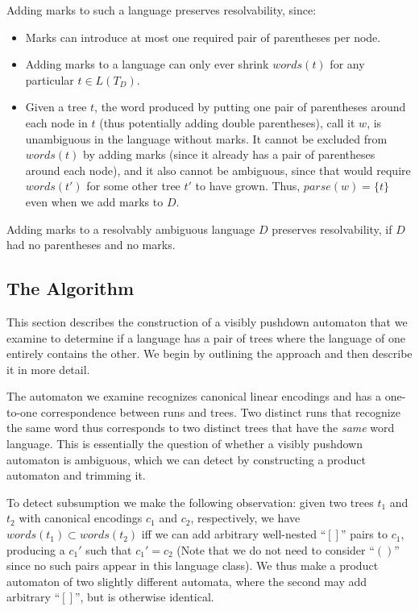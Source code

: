 \documentclass[runningheads]{llncs}
\newcommand{\parse}{\mathit{parse}} %
\newcommand{\words}{\mathit{words}} %
\newcommand{\reqpl}{(}
\newcommand{\reqpr}{)}
\newcommand{\reqp}[1]{\reqpl#1\reqpr}
\newcommand{\pospl}{[}
\newcommand{\pospr}{]}
\newcommand{\posp}[1]{\pospl#1\pospr}
\begin{document}
Adding marks to such a language preserves resolvability, since:

\begin{itemize}
  \item Marks can introduce at most one required pair of parentheses per node.
  \item Adding marks to a language can only ever shrink $\words(t)$ for any particular $t \in L(T_D)$.
  \item Given a tree $t$, the word produced by putting one pair of parentheses around each node in $t$ (thus potentially adding double parentheses), call it $w$, is unambiguous in the language without marks. It cannot be excluded from $\words(t)$ by adding marks (since it already has a pair of parentheses around each node), and it also cannot be ambiguous, since that would require $\words(t')$ for some other tree $t'$ to have grown. Thus, $\parse(w) = \{t\}$ even when we add marks to $D$.
\end{itemize}

\begin{theorem}
  Adding marks to a resolvably ambiguous language $D$ preserves resolvability, if $D$ had no parentheses and no marks.
\end{theorem}

\subsection{The Algorithm} \label{sec:lattice-vpl}

This section describes the construction of a visibly pushdown automaton that we examine to determine if a language has a pair of trees where the language of one entirely contains the other. We begin by outlining the approach and then describe it in more detail.

The automaton we examine recognizes canonical linear encodings and has a one-to-one correspondence between runs and trees. Two distinct runs that recognize the same word thus corresponds to two distinct trees that have the \emph{same} word language. This is essentially the question of whether a visibly pushdown automaton is ambiguous, which we can detect by constructing a product automaton and trimming it.

To detect subsumption we make the following observation: given two trees $t_1$ and $t_2$ with canonical encodings $c_1$ and $c_2$, respectively, we have $\words(t_1) \subset \words(t_2)$ iff we can add arbitrary well-nested ``$\posp{}$'' pairs to $c_1$, producing a $c_1'$ such that $c_1' = c_2$ (Note that we do not need to consider ``$\reqp{}$'' since no such pairs appear in this language class). We thus make a product automaton of two slightly different automata, where the second may add arbitrary ``$\posp{}$'', but is otherwise identical.
\end{document}
